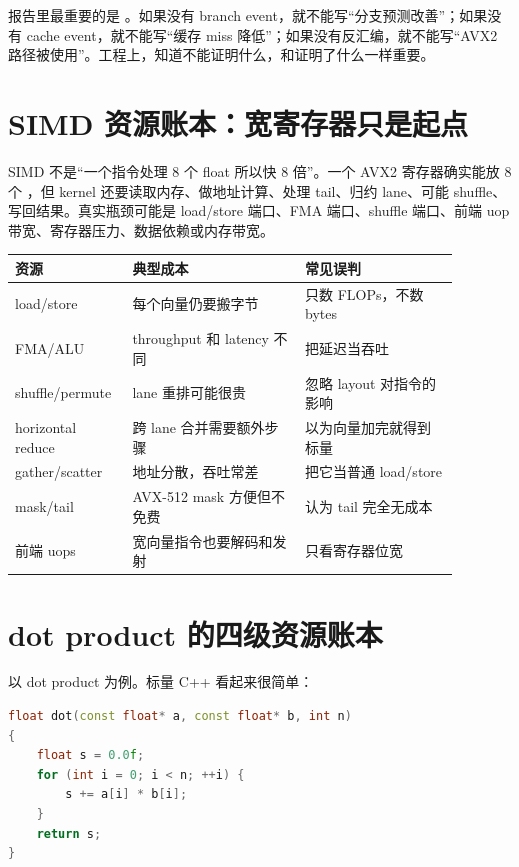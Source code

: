 报告里最重要的是 。如果没有 branch event，就不能写“分支预测改善”；如果没有 cache event，就不能写“缓存 miss 降低”；如果没有反汇编，就不能写“AVX2 路径被使用”。工程上，知道不能证明什么，和证明了什么一样重要。

\section{SIMD 资源账本：宽寄存器只是起点}

SIMD 不是“一个指令处理 8 个 float 所以快 8 倍”。一个 AVX2  寄存器确实能放 8 个 ，但 kernel 还要读取内存、做地址计算、处理 tail、归约 lane、可能 shuffle、写回结果。真实瓶颈可能是 load/store 端口、FMA 端口、shuffle 端口、前端 uop 带宽、寄存器压力、数据依赖或内存带宽。

\begin{center}
\small
\begin{tabular}{p{0.20\linewidth}p{0.36\linewidth}p{0.32\linewidth}}
\toprule
资源 & 典型成本 & 常见误判 \\
\midrule
load/store & 每个向量仍要搬字节 & 只数 FLOPs，不数 bytes \\
FMA/ALU & throughput 和 latency 不同 & 把延迟当吞吐 \\
shuffle/permute & lane 重排可能很贵 & 忽略 layout 对指令的影响 \\
horizontal reduce & 跨 lane 合并需要额外步骤 & 以为向量加完就得到标量 \\
gather/scatter & 地址分散，吞吐常差 & 把它当普通 load/store \\
mask/tail & AVX-512 mask 方便但不免费 & 认为 tail 完全无成本 \\
前端 uops & 宽向量指令也要解码和发射 & 只看寄存器位宽 \\
\bottomrule
\end{tabular}
\end{center}

\section{dot product 的四级资源账本}

以 dot product 为例。标量 C++ 看起来很简单：

\begin{lstlisting}[language=C++]
float dot(const float* a, const float* b, int n)
{
    float s = 0.0f;
    for (int i = 0; i < n; ++i) {
        s += a[i] * b[i];
    }
    return s;
}
\end{lstlisting}

